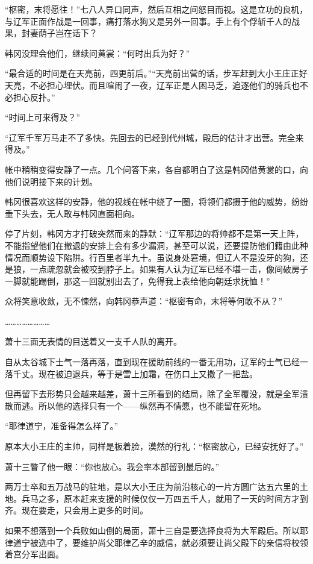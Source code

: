 “枢密，末将愿往！”七八人异口同声，然后互相之间怒目而视。这是立功的良机，与辽军正面作战是一回事，痛打落水狗又是另外一回事。手上有个俘斩千人的战果，封妻荫子岂在话下？

韩冈没理会他们，继续问黄裳：“何时出兵为好？”

“最合适的时间是在天亮前，四更前后。”“天亮前出营的话，步军赶到大小王庄正好天亮，不必担心埋伏。而且喧闹了一夜，辽军正是人困马乏，追逐他们的骑兵也不必担心反扑。”

“时间上可来得及？”

“辽军千军万马走不了多快。先回去的已经到代州城，殿后的估计才出营。完全来得及。”

帐中稍稍变得安静了一点。几个问答下来，各自都明白了这是韩冈借黄裳的口，向他们说明接下来的计划。

韩冈很喜欢这样的安静，他的视线在帐中绕了一圈，将领们都摄于他的威势，纷纷垂下头去，无人敢与韩冈直面相向。

停了片刻，韩冈方才打破突然而来的静默：“辽军那边的将帅都不是第一天上阵，不能指望他们在撤退的安排上会有多少漏洞，甚至可以说，还要提防他们籍由此种情况而顺势设下陷阱。行百里者半九十。虽说身处窘境，但辽人不是没牙的狗，还是狼，一点疏忽就会被咬到脖子上。如果有人认为辽军已经不堪一击，像间破房子一脚就能踢倒，那这一回就别出去了，免得我上表给他向朝廷求抚恤！”

众将笑意收敛，无不悚然，向韩冈恭声道：“枢密有命，末将等何敢不从？”

……………………

萧十三面无表情的目送着又一支千人队的离开。

自从太谷城下士气一落再落，直到现在援助前线的一番无用功，辽军的士气已经一落千丈。现在被迫退兵，等于是雪上加霜，在伤口上又撒了一把盐。

但再留下去形势只会越来越差，萧十三所看到的结局，除了全军覆没，就是全军溃散而逃。所以他的选择只有一个——纵然再不情愿，也不能留在死地。

“耶律道宁，准备得怎么样了。”

原本大小王庄的主帅，同样是板着脸，漠然的行礼：“枢密放心，已经安抚好了。”

萧十三瞥了他一眼：“你也放心。我会率本部留到最后的。”

两万士卒和五万战马的驻地，是以大小王庄为前沿核心的一片方圆广达五六里的土地。兵马之多，原本赶来支援的时候仅仅一万四五千人，就用了一天的时间方才到齐。现在要走，只会用上更多的时间。

如果不想落到一个兵败如山倒的局面，萧十三自是要选择良将为大军殿后。所以耶律道宁被选中了，要维护尚父耶律乙辛的威信，就必须要让尚父殿下的亲信将校领着宫分军出面。

